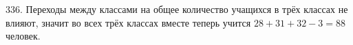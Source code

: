 336. Переходы между классами на общее количество учащихся в трёх классах не влияют, значит во всех трёх классах вместе теперь учится $28+31+32-3=88$ человек.\\
